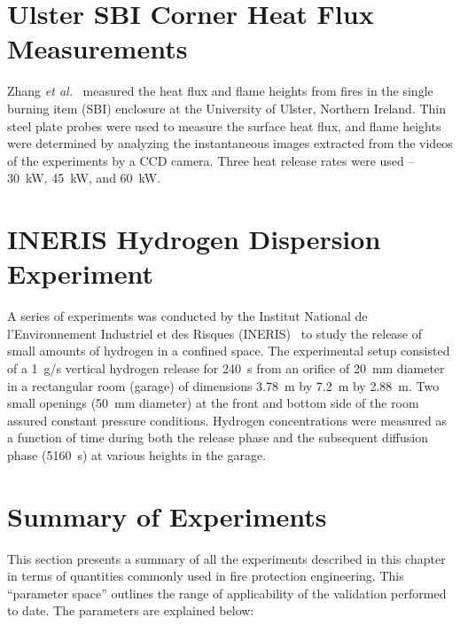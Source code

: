 \section{Ulster SBI Corner Heat Flux Measurements}

Zhang {\em et al.}~\cite{Zhang:IAFSS9} measured the heat flux and flame heights from
fires in the single burning item (SBI) enclosure at the University of Ulster, Northern Ireland.
Thin steel plate probes were used to measure the surface heat flux, and flame
heights were determined by analyzing the instantaneous images extracted from the videos of the
experiments by a CCD camera. Three heat release rates were used -- 30~kW, 45~kW, and 60~kW.

\section{INERIS Hydrogen Dispersion Experiment}

A series of experiments was conducted by the Institut National de l'Environnement Industriel et des Risques (INERIS)~\cite{INERIS} to study the release of small amounts of hydrogen in
a confined space. The experimental setup consisted of a 1~g/s vertical hydrogen release for 240~s from an orifice of 20~mm
diameter in a rectangular room (garage) of dimensions 3.78~m by 7.2~m by 2.88~m. Two small openings (50~mm diameter) at the front
and bottom side of the room assured constant pressure conditions. Hydrogen concentrations were measured as a function of time
during both the release phase and the subsequent diffusion phase (5160~s) at various heights in the garage.

\clearpage

\section{Summary of Experiments}

This section presents a summary of all the experiments described in this chapter in terms of quantities commonly used in fire protection engineering. This ``parameter space''
outlines the range of applicability of the validation performed to date. The parameters are explained below:

